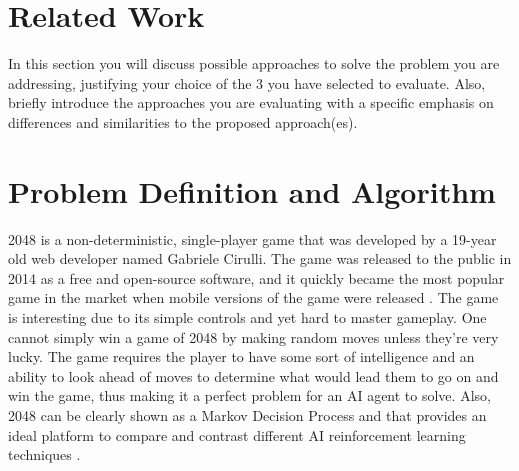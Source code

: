 \documentclass{svproc}
\begin{document}
    \section{Related Work}
    In this section you will discuss possible approaches to solve the problem you are addressing, justifying your choice of the 3 you have selected to evaluate. Also, briefly introduce the approaches you are evaluating with a specific emphasis on differences and similarities to the proposed approach(es).

    \section{Problem Definition and Algorithm} \label{Game Explanation}


    2048 is a non-deterministic, single-player game that was developed by a 19-year old web developer named Gabriele Cirulli. The game was released to the public in 2014 as a free and open-source software, and it quickly became the most popular game in the market when mobile versions of the game were released \cite{wiki_2048}. The game is interesting due to its simple controls and yet hard to master gameplay. One cannot simply win a game of 2048 by making random moves unless they’re very lucky. The game requires the player to have some sort of intelligence and an ability to look ahead of moves to determine what would lead them to go on and win the game, thus making it a perfect problem for an AI agent to solve. Also, 2048 can be clearly shown as a Markov Decision Process and that provides an ideal platform to compare and contrast different AI reinforcement learning techniques \cite{jaskowski, pedagogy}.
\end{document}
